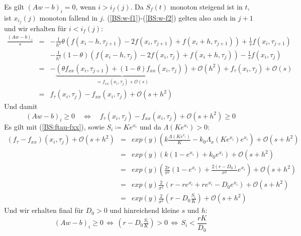 Es gilt $\left(Aw-b\right)_i = 0$, wenn $i>i_f(j)$. Da $S_f(t)$ monoton steigend ist in $t$, ist $x_{i_f}(j)$ monoton fallend in $j$. (\ref{BS:w-f1})-(\ref{BS:w-f2}) gelten also auch in $j+1$ und wir erhalten für $i< i_f(j)$:
\begin{eqnarray*}
\frac{\left(Aw-b\right)_i}{s} & = & -\frac{1}{h^2}\theta (f(x_i-h,\tau _{j+1}) -2f(x_i,\tau _{j+1}) + f(x_i+h,\tau _{j+1}))+ \frac{1}{s}f(x_i,\tau _{j+1}) \\
                    &   & -\frac{1}{h^2}(1-\theta)(f(x_i-h,\tau _{j}) -2f(x_i,\tau _{j}) + f(x_i+h,\tau _{j})) - \frac{1}{s}f(x_i,\tau _{j}) \\
                    & = & - \underbrace{(\theta f_{xx}(x_i,\tau _{j+1}) + (1-\theta)f_{xx}(x_i, \tau _j))}_{=f_{xx}(x_i,\tau _j) + \mathcal{O}(s)}+ \mathcal{O}(h^2) + f_{\tau}(x_i,\tau _{j}) + \mathcal{O}(s)\\
                    & = & f_{\tau}(x_i,\tau _{j})-f_{xx}(x_i,\tau _{j})+\mathcal{O}(s+h^2)
\end{eqnarray*}
Und damit
\begin{equation}
\left(Aw-b\right)_i \geq 0 \quad \Leftrightarrow \quad f_{\tau}(x_i,\tau _j) - f_{xx}(x_i,\tau _j) + \mathcal{O}(s+h^2) \geq 0 \label{BS:aequivalenz}
\end{equation}
Es gilt mit (\ref{BS:ftau-fxx}), sowie $S_i \coloneqq Ke^{x_i}$ und da  $\Lambda(Ke^{x_i}) > 0$:
\begin{eqnarray*}
(f_\tau - f_{xx})(x_i,\tau _j)+\mathcal{O}(s+h^2) &=& exp(y)\left(k\frac{\Lambda(Ke^{x_i})}{K}-k_0\Lambda_{x}(Ke^{x_i})e^{x_i}\right)+\mathcal{O}(s+h^2) \\
                &=& exp(y)\left( k(1-e^{x_i}) + k_0e^{x_i}\right) +\mathcal{O}(s+h^2)\\
                &=& exp(y)\left( \tfrac{2r}{\sigma^2}(1-e^{x_i})+ \tfrac{2(r-D_0)}{\sigma^2}e^{x_i}\right)+\mathcal{O}(s+h^2) \\
                &=& exp(y)\tfrac{2}{\sigma^2}\left(r - re^{x_i} + re^{x_i} - D_0e^{x_i}\right)+\mathcal{O}(s+h^2) \\
                &=& exp(y)\tfrac{2}{\sigma^2}\left(r - D_0\tfrac{S_i}{K}\right)+\mathcal{O}(s+h^2)            
\end{eqnarray*}
Und wir erhalten final für $D_0 > 0$ und hinreichend kleine $s$ und $h$: 
\begin{equation}
\left(Aw-b\right)_i \geq 0 \, \Leftrightarrow \, \left(r - D_0\tfrac{S_i}{K}\right)>0 \, \Leftrightarrow \, S_i < \frac{rK}{D_0}
\end{equation}
